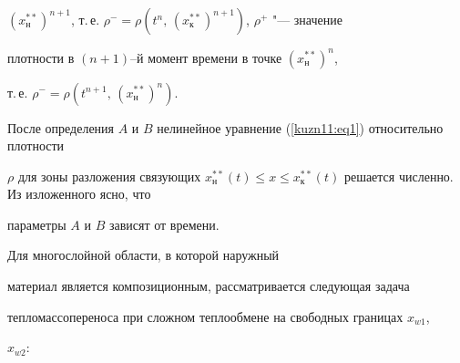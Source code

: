 $(x_\text{н}^{\ast \ast})^{n+1}$, т.\,е. $\rho^- = \rho \left(

t^n,\,(x_\text{к}^{\ast \ast})^{n+1}\right)$, $\rho^+$ "---  значение

плотности в $(n+1)$--й момент времени в точке $(x_\text{н}^{\ast \ast} )^n$,

т.\,е. $\rho^- = \rho \left( t^{n+1},\,(x_\text{н}^{\ast \ast})^n \right)$.



После определения $A$ и $B$ нелинейное уравнение (\ref{kuzn11:eq1}) относительно плотности

$\rho $ для зоны разложения связующих $x_\text{н}^{\ast \ast} (t) \le x \le

x_\text{к}^{\ast \ast} (t)$ решается численно. Из изложенного ясно, что

параметры $A$ и $B$ зависят от времени.



\smallskip



 Для многослойной области, в которой наружный

материал является композиционным, рассматривается следующая задача

тепломассопереноса при сложном теплообмене на свободных границах $x_{w1}$,

$x_{w2}$:

